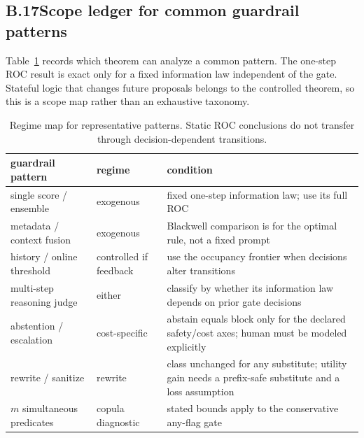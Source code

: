\subsection*{B.17\quad Scope ledger for common guardrail patterns}
Table~\ref{tab:cover} records which theorem can analyze a common pattern. The
one-step ROC result is exact only for a fixed information law independent of
the gate. Stateful logic that changes future proposals belongs to the
controlled theorem, so this is a scope map rather than an exhaustive taxonomy.

\begin{table}[t]
\caption{Regime map for representative patterns. Static ROC conclusions do
not transfer through decision-dependent transitions.}
\label{tab:cover}
\centering\footnotesize\setlength{\tabcolsep}{3.5pt}
\renewcommand{\arraystretch}{1.7}
\begin{tabular}{@{}>{\raggedright\arraybackslash}p{}>{\raggedright\arraybackslash}p{}>{\raggedright\arraybackslash}p{}@{}}
\toprule
guardrail pattern & regime & condition \\
\midrule
single score / ensemble & exogenous & fixed one-step information law; use its full ROC \\
\midrule
metadata / context fusion & exogenous & Blackwell comparison is for the optimal rule, not a fixed prompt \\
\midrule
history / online threshold & controlled if feedback & use the occupancy frontier when decisions alter transitions \\
\midrule
multi-step reasoning judge & either & classify by whether its information law depends on prior gate decisions \\
\midrule
abstention / escalation & cost-specific & abstain equals block only for the declared safety/cost axes; human must be modeled explicitly \\
\midrule
rewrite / sanitize & rewrite & class unchanged for any substitute; utility gain needs a prefix-safe substitute and a loss assumption \\
\midrule
$m$ simultaneous predicates & copula diagnostic & stated bounds apply to the conservative any-flag gate \\
\bottomrule
\end{tabular}
\end{table}

